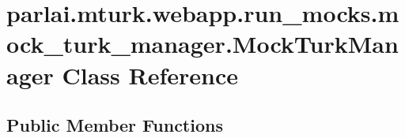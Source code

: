 \hypertarget{classparlai_1_1mturk_1_1webapp_1_1run__mocks_1_1mock__turk__manager_1_1MockTurkManager}{}\section{parlai.\+mturk.\+webapp.\+run\+\_\+mocks.\+mock\+\_\+turk\+\_\+manager.\+Mock\+Turk\+Manager Class Reference}
\label{classparlai_1_1mturk_1_1webapp_1_1run__mocks_1_1mock__turk__manager_1_1MockTurkManager}
\subsection*{Public Member Functions}
